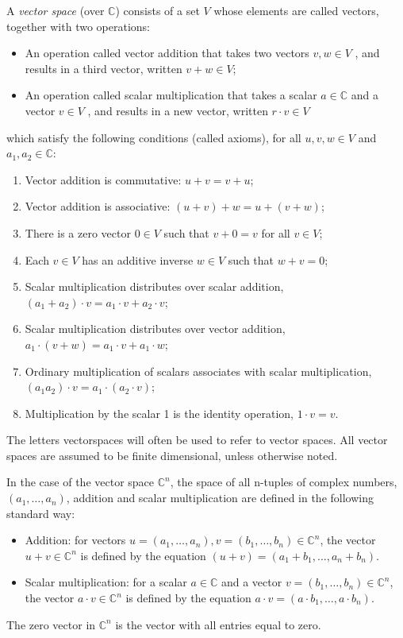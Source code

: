 \begin{definition}
A \emph{vector space} (over $\mathbb{C}$)  consists of a set $V$ whose elements are called vectors, together with two operations:
\begin{itemize}
  \item An operation called vector addition that takes two vectors $v, w \in V$ , and results in a third vector, written $v + w \in V$;
  \item An operation called scalar multiplication that takes a scalar $a \in \mathbb{C}$ and a vector $v \in V$ , and results in a new vector, written $r \cdot v \in V$
\end{itemize}
which satisfy the following conditions (called axioms), for all $u, v, w \in V$ and $a_1, a_2 \in \mathbb{C}$:

\begin{enumerate}
  \item Vector addition is commutative: $u + v = v + u$;
  \item Vector addition is associative: $(u + v) + w = u + (v + w) $;
  \item There is a zero vector $0 \in V$ such that $v +0 = v$ for all $v \in V$;
  \item Each $v \in V$ has an additive inverse $w \in V$ such that $w + v = 0$;
  \item Scalar multiplication distributes over scalar addition, $(a_1+a_2) \cdot v = a_1 \cdot v + a_2 \cdot v$;
  \item Scalar multiplication distributes over vector addition, $a_1 \cdot (v + w) = a_1 \cdot v + a_1 \cdot w$;
  \item Ordinary multiplication of scalars associates with scalar multiplication, $(a_1 a_2) \cdot v = a_1 \cdot (a_2 \cdot v)$;
  \item Multiplication by the scalar 1 is the identity operation, $1 \cdot v = v$.
\end{enumerate}

\end{definition}

The letters \gls{vectorspaces} will often be used to refer to vector spaces. All vector spaces are assumed to be finite dimensional, unless otherwise noted.  

In the case of the vector space $\mathbb{C}^{n}$, the space of all n-tuples of complex numbers, $(a_1, \ldots , a_n)$, addition and scalar multiplication are defined in the following standard way:
\begin{itemize}
  \item Addition: for vectors $u = (a_1, \ldots , a_n), v = (b_1, \ldots , b_n)  \in \mathbb{C}^{n}$, the vector $u + v \in \mathbb{C}^{n}$ is defined by the equation $(u + v) = (a_1 + b_1, \ldots, a_n+b_n)$.
  \item Scalar multiplication: for a scalar $a \in \mathbb{C}$ and a vector $v = (b_1, \ldots , b_n) \in \mathbb{C}^{n}$, the vector $a \cdot v \in \mathbb{C}^{n}$ is defined by the equation $a \cdot v = (a \cdot b_1, \ldots, a \cdot b_n)$.
\end{itemize}
The zero vector in $\mathbb{C}^{n}$ is the vector with all entries equal to zero.

